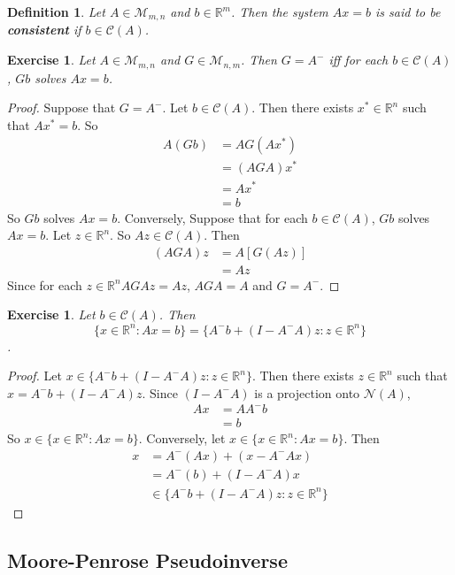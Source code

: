 \documentclass[12pt]{amsart}
\newtheorem{defn}[thm]{Definition}
\newtheorem{ex}[thm]{Exercise}
\newcommand{\R}{\mathbb{R}}
\newcommand{\MC}{\mathcal{C}}
\newcommand{\MN}{\mathcal{N}}
\newcommand{\MM}{\mathcal{M}}
\begin{document}
\begin{defn}
Let $A \in \MM_{m,n}$ and $b \in \R^m$. Then the system $Ax=b$ is said to be \textbf{consistent} if $b \in \MC(A)$.
\end{defn}

\begin{ex}
Let $A \in \MM_{m,n}$ and $G \in \MM_{n,m}$. Then $G = A^-$ iff for each $b \in \MC(A)$, $Gb$ solves $Ax = b$. 
\end{ex}

\begin{proof}
Suppose that $G = A^-$. Let $b \in \MC(A)$. Then there exists $x^* \in \R^n$ such that $Ax^* = b$. So
\begin{align*}
A(Gb)
&= AG(Ax^*) \\
&= (AGA)x^* \\
&= Ax^* \\
&= b
\end{align*}
So $Gb$ solves $Ax =b$. Conversely, Suppose that for each $b \in \MC(A)$, $Gb$ solves $Ax = b$. Let $z \in \R^n$. So $Az \in \MC(A)$. Then  
\begin{align*}
(AGA)z 
&= A[G(Az)] \\
&= Az
\end{align*}
Since for each $z \in \R^n AGAz = Az$, $AGA = A$ and $G = A^-$.
\end{proof}
\vspace{2mm}

\begin{ex}
Let $b \in \MC(A)$. Then $$\{x \in \R^n: Ax = b\} = \{A^-b+(I-A^-A)z: z \in \R^n \}$$.
\end{ex}

\begin{proof}
Let $x \in \{A^-b+(I-A^-A)z: z \in \R^n \}$. Then there exists $z \in \R^n$ such that $x = A^-b+(I-A^-A)z$. Since $(I-A^-A)$ is a projection onto $\MN(A)$, 
\begin{align*}
Ax
&= AA^-b \\
&= b
\end{align*}
So $x \in \{x \in \R^n: Ax = b\}$. Conversely, let $x \in \{x \in \R^n: Ax = b\}$. Then 
\begin{align*}
x 
&= A^-(Ax) + (x - A^-Ax) \\
&= A^-(b) + (I-A^-A)x \\
& \in \{A^-b+(I-A^-A)z: z \in \R^n \}
\end{align*}
\end{proof}

\subsection{Moore-Penrose Pseudoinverse}
\end{document}
